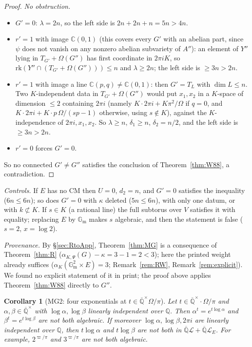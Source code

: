 \documentclass[11pt]{amsart}
\newtheorem{corollary}[theorem]{Corollary}
\theoremstyle{definition}
\newcommand{\Qb}{\overline{\mathbb{Q}}}
\newcommand{\C}{\mathbb{C}}
\newcommand{\Q}{\mathbb{Q}}
\newcommand{\Gm}{\mathbb{G}_{\mathrm m}}
\newcommand{\Lg}{\mathcal{L}}
\newcommand{\vp}{\varpi}
\begin{document}
\begin{proof}
\emph{No obstruction.}
\begin{itemize}
\item $G'=0$: $\lambda=2n$, so the left side is $2n+2n+n=5n>4n$.
\item $r'=1$ with image $\C(0,1)$ (this covers every $G'$ with an abelian part, since $\psi$ does not vanish on any
nonzero abelian subvariety of $A''$): an element of $Y''$ lying in $T_{G'}+\Omega(G'')$ has first coordinate in
$2\pi iK$, so $\mathrm{rk}(Y''\cap(T_{G'}+\Omega(G'')))\le n$ and $\lambda\ge2n$; the left side is $\ge3n>2n$.
\item $r'=1$ with image a line $\C(p,q)\neq\C(0,1)$: then $G'=T_L$ with $\dim L\le n$. Two $K$-independent data in
$T_{G'}+\Omega(G'')$ would put $x_1,x_2$ in a $K$-space of dimension $\le2$ containing $2\pi i$ (namely
$K\cdot2\pi i+K\pi^2/\Omega$ if $q=0$, and $K\cdot2\pi i+K\cdot p\,\Omega/(sp-1)$ otherwise, using $s\notin K$), against
the $K$-independence of $2\pi i,x_1,x_2$. So $\lambda\ge n$, $\delta_1\ge n$, $\delta_2=n/2$, and the left side is
$\ge3n>2n$.
\item $r'=0$ forces $G'=0$.
\end{itemize}
So no connected $G'\ne G''$ satisfies the conclusion of Theorem~\ref{thm:W88}, a contradiction.
\end{proof}

\noindent\emph{Controls.} If $E$ has no CM then $U=0$, $d_2=n$, and $G'=0$ satisfies the inequality ($6n\le6n$); so
does $G'=0$ with $\kappa$ deleted ($5n\le6n$), with only one datum, or with $k\not\subset K$. If $s\in K$ (a rational line) the
full subtorus over $V$ satisfies it with equality; replacing $E$ by $\Gm$ makes $s$ algebraic, and then the statement is
false ($s=2$, $x=\log2$).

\noindent\emph{Provenance.} By \S\ref{sec:RtoApp}, Theorem~\ref{thm:MG} is a consequence of Theorem~\ref{thm:R}
($\alpha_{K,\Psi}(G)-\kappa=3-1=2<3$); here the printed weight already suffices ($\alpha_K(\Gm^2\times E)=3$;
Remark~\ref{rem:RW}, Remark~\ref{rem:explicit}). We found no explicit statement of it in print; the proof above applies
Theorem~\ref{thm:W88} directly to $G''$.

\begin{corollary}[MG2: four exponentials at $t\in\Qb^\times\Omega/\pi$]\label{cor:MG2}
Let $t\in\Qb^\times\cdot\Omega/\pi$ and $\alpha,\beta\in\Qb^\times$ with $\log\alpha,\log\beta$ linearly independent over
$\Q$. Then $\alpha^t=e^{t\log\alpha}$ and $\beta^t=e^{t\log\beta}$ are not both algebraic. If moreover $\log\alpha,\log\beta,2\pi i$
are linearly independent over $\Q$, then $t\log\alpha$ and $t\log\beta$ are not both in $\Qb\Lg+\Qb\Lg_E$. For example,
$2^{\vp/\pi}$ and $3^{\vp/\pi}$ are not both algebraic.
\end{corollary}
\end{document}
